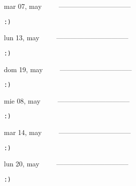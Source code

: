 \documentclass[letterpaper,10pt]{article}
\begin{document}
\begin{multicols}{3}
{mar 07, may\ \ \ \ \ --------------------------------}
\begin{flushright}\begin{small}\texttt{:)}\end{small}\end{flushright}
\vfill
{lun 13, may\ \ \ \ \ --------------------------------}
\begin{flushright}\begin{small}\texttt{:)}\end{small}\end{flushright}\par
\vfill
{dom 19, may\ \ \ \ \ --------------------------------}
\begin{flushright}\begin{small}\texttt{:)}\end{small}\end{flushright}\par
\vfill
\end{multicols}
\vspace{1.05cm}

\begin{multicols}{3}
{mie 08, may\ \ \ \ \ --------------------------------}
\begin{flushright}\begin{small}\texttt{:)}\end{small}\end{flushright}
\vfill
{mar 14, may\ \ \ \ \ --------------------------------}
\begin{flushright}\begin{small}\texttt{:)}\end{small}\end{flushright}\par
\vfill
{lun 20, may\ \ \ \ \ --------------------------------}
\begin{flushright}\begin{small}\texttt{:)}\end{small}\end{flushright}\par
\vfill
\end{multicols}
\vspace{1.05cm}
\end{document}
